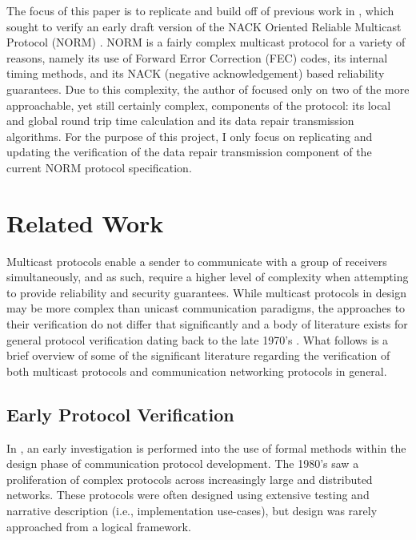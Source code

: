 \documentclass[10pt, journal]{IEEEtran}
\begin{document}
The focus of this paper is to replicate and build off of previous work in \cite{Lien2004}, which sought to verify an early draft version of the NACK Oriented Reliable Multicast Protocol (NORM) \cite{rfc5740}. NORM is a fairly complex multicast protocol for a variety of reasons, namely its use of Forward Error Correction (FEC) codes, its internal timing methods, and its NACK (negative acknowledgement) based reliability guarantees. Due to this complexity, the author of \cite{Lien2004} focused only on two of the more approachable, yet still certainly complex, components of the protocol: its local and global round trip time calculation and its data repair transmission algorithms. For the purpose of this project, I only focus on replicating and updating the verification of the data repair transmission component of the current NORM protocol specification.

\section{Related Work}
Multicast protocols enable a sender to communicate with a group of receivers simultaneously, and as such, require a higher level of complexity when attempting to provide reliability and security guarantees. While multicast protocols in design may be more complex than unicast communication paradigms, the approaches to their verification do not differ that significantly and a body of literature exists for general protocol verification dating back to the late 1970's \cite{Bochman1980}. What follows is a brief overview of some of the significant literature regarding the verification of both multicast protocols and communication networking protocols in general.

\subsection{Early Protocol Verification}
In \cite{Bochman1980}, an early investigation is performed into the use of formal methods within the design phase of communication protocol development. The 1980's saw a proliferation of complex protocols across increasingly large and distributed networks. These protocols were often designed using extensive testing and narrative description (i.e., implementation use-cases), but design was rarely approached from a logical framework. 
\end{document}
